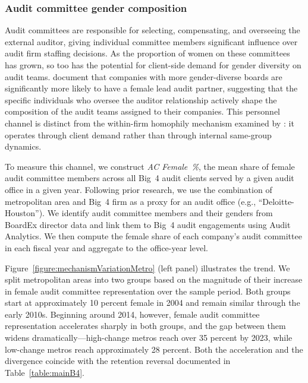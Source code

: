 \documentclass[11pt]{article}
\begin{document}
        \subsubsection{Audit committee gender composition}\label{section:auditCommittee}

            Audit committees are responsible for selecting, compensating, and overseeing the external auditor, giving individual committee members significant influence over audit firm staffing decisions. As the proportion of women on these committees has grown, so too has the potential for client-side demand for gender diversity on audit teams. \textcite{leeAuditPartnerAssignments2019} document that companies with more gender-diverse boards are significantly more likely to have a female lead audit partner, suggesting that the specific individuals who oversee the auditor relationship actively shape the composition of the audit teams assigned to their companies. This personnel channel is distinct from the within-firm homophily mechanism examined by \textcite{ahnDiversityCareerTrajectories2025}: it operates through client demand rather than through internal same-group dynamics.

            To measure this channel, we construct \textit{AC Female~\%}, the mean share of female audit committee members across all Big~4 audit clients served by a given audit office in a given year. Following prior research, we use the combination of metropolitan area and Big~4 firm as a proxy for an audit office (e.g., ``Deloitte-Houston''). We identify audit committee members and their genders from BoardEx director data and link them to Big~4 audit engagements using Audit Analytics. We then compute the female share of each company's audit committee in each fiscal year and aggregate to the office-year level.

            Figure~\ref{figure:mechanismVariationMetro} (left panel) illustrates the trend. We split metropolitan areas into two groups based on the magnitude of their increase in female audit committee representation over the sample period. Both groups start at approximately 10 percent female in 2004 and remain similar through the early 2010s. Beginning around 2014, however, female audit committee representation accelerates sharply in both groups, and the gap between them widens dramatically---high-change metros reach over 35 percent by 2023, while low-change metros reach approximately 28 percent. Both the acceleration and the divergence coincide with the retention reversal documented in Table~\ref{table:mainB4}.
\end{document}
